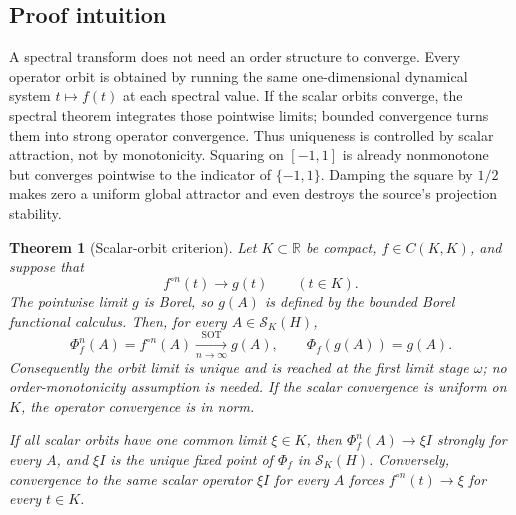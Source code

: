 \documentclass[11pt]{article}
\newtheorem{theorem}{Theorem}
\newcommand{\sot}{\mathrm{SOT}}
\newcommand{\1}{\mathbf 1}
\begin{document}
\subsection*{Proof intuition}

A spectral transform does not need an order structure to converge.  Every
operator orbit is obtained by running the same one-dimensional dynamical
system \(t\mapsto f(t)\) at each spectral value.  If the scalar orbits
converge, the spectral theorem integrates those pointwise limits; bounded
convergence turns them into strong operator convergence.  Thus uniqueness is
controlled by scalar attraction, not by monotonicity.  Squaring on
\([-1,1]\) is already nonmonotone but converges pointwise to the indicator of
\(\{-1,1\}\).  Damping the square by \(1/2\) makes zero a uniform global
attractor and even destroys the source's projection stability.

\begin{theorem}[Scalar-orbit criterion]\label{thm:criterion}
Let \(K\subset\mathbb R\) be compact, \(f\in C(K,K)\), and suppose that
\[
 f^{\circ n}(t)\longrightarrow g(t)\qquad(t\in K).
\]
The pointwise limit \(g\) is Borel, so \(g(A)\) is defined by the bounded
Borel functional calculus.
Then, for every \(A\in\mathcal S_K(H)\),
\[
 \Phi_f^n(A)=f^{\circ n}(A)\xrightarrow[n\to\infty]{\sot}g(A),
 \qquad \Phi_f(g(A))=g(A).
\]
Consequently the orbit limit is unique and is reached at the first limit
stage \(\omega\); no order-monotonicity assumption is needed.  If the scalar
convergence is uniform on \(K\), the operator convergence is in norm.

If all scalar orbits have one common limit \(\xi\in K\), then
\(\Phi_f^n(A)\to\xi I\) strongly for every \(A\), and \(\xi I\) is the unique
fixed point of \(\Phi_f\) in \(\mathcal S_K(H)\).  Conversely, convergence to
the same scalar operator \(\xi I\) for every \(A\) forces
\(f^{\circ n}(t)\to\xi\) for every \(t\in K\).
\end{theorem}
\end{document}
